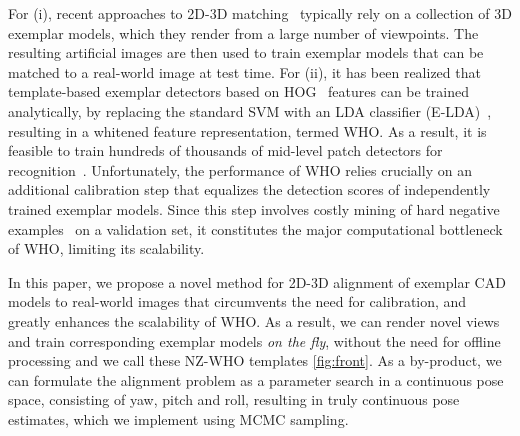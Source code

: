 For (i), recent approaches to 2D-3D matching~\cite{Aubry14, Lim14}
typically rely on a
collection of 3D exemplar models, which they render from a
large number of viewpoints. The resulting artificial images are then
used to train exemplar models that can be matched to a real-world
image at test time.
%
For (ii), it has been realized that template-based exemplar detectors
based on HOG~\cite{Dalal05} features can be trained analytically, by
replacing the standard SVM with an LDA classifier
(E-LDA)~\cite{Hariharan12}, resulting in a whitened feature
representation, termed WHO. As a result, it is feasible to train
hundreds of thousands of mid-level patch detectors for
recognition~\cite{Aubry14}.
%
Unfortunately, the performance of WHO relies crucially on an
additional calibration step that equalizes the detection scores of
independently trained exemplar models. Since this step involves costly
mining of hard negative examples~\cite{Dalal05,Felzenszwalb10} on a
validation set, it constitutes the major computational bottleneck of
WHO, limiting its scalability.

In this paper, we propose a novel method for 2D-3D alignment of
exemplar CAD models to real-world images that circumvents the need for
calibration, and greatly enhances the scalability of WHO. As a
result, we can render novel views and train corresponding exemplar
models {\em on the fly}, without the need for offline processing and we call these NZ-WHO templates \ref{fig:front}. As a
by-product, we can formulate the alignment problem as a parameter
search in a continuous pose space, consisting of yaw, pitch and roll, resulting in truly continuous pose estimates, which
we implement using MCMC sampling.
%

